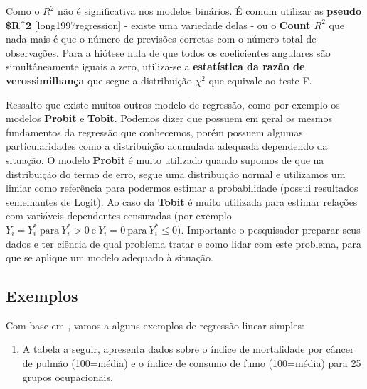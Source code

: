 \documentclass[
  openany]{book}
\providecommand{\tightlist}{%
  \setlength{\itemsep}{0pt}\setlength{\parskip}{0pt}}
\begin{document}
Como o \(R^2\) não é significativa nos modelos binários. É comum utilizar as \textbf{pseudo \$R\^{}2} {[}long1997regression{]} - existe uma variedade delas - ou o \textbf{Count \(R^2\)} que nada mais é que o número de previsões corretas com o número total de observações. Para a hiótese nula de que todos os coeficientes angulares são simultâneamente iguais a zero, utiliza-se a \textbf{estatística da razão de verossimilhança} que segue a distribuição \(\chi^2\) que equivale ao teste F.

Ressalto que existe muitos outros modelo de regressão, como por exemplo os modelos \textbf{Probit} e \textbf{Tobit}. Podemos dizer que possuem em geral os mesmos fundamentos da regressão que conhecemos, porém possuem algumas particularidades como a distribuição acumulada adequada dependendo da situação. O modelo \textbf{Probit} é muito utilizado quando supomos de que na distribuição do termo de erro, segue uma distribuição normal e utilizamos um limiar como referência para podermos estimar a probabilidade (possui resultados semelhantes de Logit). Ao caso da \textbf{Tobit} é muito utilizada para estimar relações com variáveis dependentes censuradas (por exemplo \(Y_i=Y_i^* \ \mbox{para} \ Y_i^* > 0 \ \mbox{e} \ Y_i=0 \ \mbox{para} \ Y_i^*\leq 0\)). Importante o pesquisador preparar seus dados e ter ciência de qual problema tratar e como lidar com este problema, para que se aplique um modelo adequado à situação.

\hypertarget{exemplo1reg}{%
\subsection{Exemplos}\label{exemplo1reg}}

Com base em \citet{morettin2017estatistica}, vamos a alguns exemplos de regressão linear simples:

\begin{enumerate}
\def\labelenumi{\arabic{enumi}.}
\tightlist
\item
  A tabela a seguir, apresenta dados sobre o índice de mortalidade por câncer de pulmão (100=média) e o índice de consumo de fumo (100=média) para 25 grupos ocupacionais.
\end{enumerate}
\end{document}
